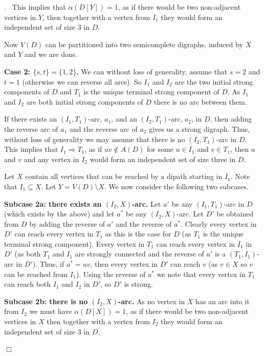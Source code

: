 \documentclass{article}
\newcommand{\2}{\vspace{2mm}}
\renewenvironment{proof}[1][]{\par \noindent {\bf Proof#1}.\ }{\hfill$\Box$
\par \vspace{11pt}}
\theoremstyle{definition}
\begin{document}
\begin{proof}
This implies that $\alpha(D[Y])=1$, 
as if there would be two non-adjacent vertices in $Y$,
then together with a vertex from $I_1$ they would form an independent set of size 3 in $D$.

Now $V(D)$ can be partitioned into two semicomplete digraphs, induced by $X$ and $Y$ and we are done.


\2

{\bf Case 2: $\{s,t\}=\{1,2\}$.} We can without loss of generality, assume that $s=2$ and $t=1$ (otherwise we can reverse all arcs).
So $I_1$ and $I_2$ are the two initial strong components of $D$ and $T_1$ is the unique terminal strong component of $D$.
As $I_1$ and $I_2$ are both initial strong components of $D$ there is no arc between them.

If there exists an $(I_1,T_1)$-arc, $a_1$, and an $(I_2,T_1)$-arc, $a_2$, in $D$, then adding the reverse arc of $a_1$ and the reverse arc of $a_2$
gives us a strong digraph. Thus, without loss of generality we may assume that there is no $(I_2,T_1)$-arc
in $D$. This implies that $I_1 \Rightarrow T_1$, as if $uv \not\in A(D)$ for some $u \in I_1$ and $v \in T_1$, then $u$ and $v$ and any vertex
in $I_2$ would form an independent set of size three in $D$.

Let $X$ contain all vertices that can be reached by a dipath starting in $I_1$. Note that $I_1 \subseteq X$. Let $Y = V(D) \setminus X$.
We now consider the following two subcases.

\2

{\bf Subcase 2a: there exists an $(I_2,X)$-arc.} 
Let $a'$ be any $(I_1,T_1)$-arc in $D$ (which exists by the above) and let $a^*$ be any $(I_2,X)$-arc.
Let $D'$ be obtained from $D$ by adding the reverse of $a'$ and the reverse of $a^*$.
Clearly every vertex in $D'$ can reach every vertex in $T_1$ as this is the case for $D$ (as $T_1$ is the unique terminal strong component).
Every vertex in $T_1$ can reach every vertex in $I_1$ in $D'$ (as both $T_1$ and $I_1$ are strongly connected and the reverse of $a'$ is a
$(T_1,I_1)$-arc in $D'$). Thus, if $a^*=uv$, then every vertex in $D'$ can reach $v$ (as $v \in X$ so $v$ can be reached from $I_1$).
Using the reverse of $a^*$ we note that every vertex in $T_1$ can reach both $I_1$ and $I_2$ in $D'$, so $D'$ is strong.


\2

{\bf Subcase 2b: there is no $(I_2,X)$-arc.} 
As no vertex in $X$ has an arc into it from $I_2$ we must have $\alpha(D[X])=1$, as if there would be two non-adjacent vertices in $X$
then together with a vertex from $I_2$ they would form an independent set of size 3 in $D$.


\end{proof}
\end{document}
